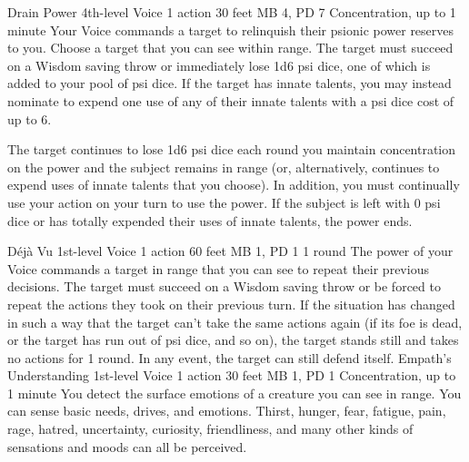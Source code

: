 \DndPowerHeader%
    {Drain Power\label{pwr:drain_power}}
    {4th-level Voice}
    {1 action}
    {30 feet}
    {MB 4, PD 7}
    {Concentration, up to 1 minute}
Your Voice commands a target to relinquish
their psionic power reserves to you. Choose a target that
you can see within range. The target must succeed on a Wisdom
saving throw or immediately lose 1d6 psi dice, one of which
is added to your pool of psi dice. If the target has innate
talents, you may instead nominate to expend one use of any
of their innate talents with a psi dice cost of up to 6.

The target continues to lose 1d6 psi dice each round you maintain
concentration on the power and the subject remains in range
(or, alternatively, continues to expend uses of innate talents
that you choose). In addition, you must continually use your
action on your turn to use the power. If the subject is left
with 0 psi dice or has totally expended their uses of innate
talents, the power ends.

\DndPowerHeader%
    {Déjà Vu\label{pwr:déjà_vu}}
    {1st-level Voice}
    {1 action}
    {60 feet}
    {MB 1, PD 1}
    {1 round}
The power of your Voice commands a target
in range that you can see to repeat their previous decisions.
The target must succeed on a Wisdom saving throw or be forced
to repeat the actions they took on their previous turn. If
the situation has changed in such a way that the target can't
take the same actions again (if its foe is dead, or the target
has run out of psi dice, and so on), the target stands still
and takes no actions for 1 round. In any event, the target
can still defend itself.
\DndPowerHeader%
    {Empath's Understanding\label{pwr:empaths_understanding}}
    {1st-level Voice}
    {1 action}
    {30 feet}
    {MB 1, PD 1}
    {Concentration, up to 1 minute}
You detect the surface emotions of a creature
you can see in range. You can sense basic needs, drives, and
emotions. Thirst, hunger, fear, fatigue, pain, rage, hatred,
uncertainty, curiosity, friendliness, and many other kinds
of sensations and moods can all be perceived.

